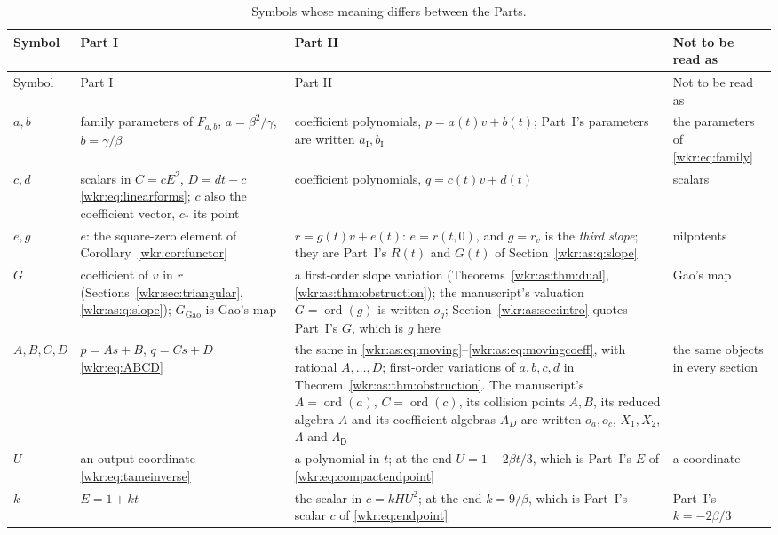 \documentclass[11pt,a4paper]{article}
\numberwithin{equation}{section}
\theoremstyle{definition}
\theoremstyle{remark}
\newcommand{\cstar}{c_*}
\newcommand{\ord}{\operatorname{ord}}
\newcommand{\Dcap}{\mathsf D}
\begin{document}
\begingroup\small
\setlength{\tabcolsep}{4pt}
\begin{longtable}{@{}>{\raggedright}p{}>{\raggedright}p{}>{\raggedright}p{}>{\raggedright\arraybackslash}p{}@{}}
\caption{Symbols whose meaning differs between the Parts.}
\label{wkr:as:tab:notation}\\
\toprule
Symbol & Part I & Part II & Not to be read as\\
\midrule
\endfirsthead
\toprule
Symbol & Part I & Part II & Not to be read as\\
\midrule
\endhead
$a,b$ & family parameters of $F_{a,b}$, $a=\beta^2/\gamma$, $b=\gamma/\beta$ &
coefficient polynomials, $p=a(t)v+b(t)$; Part~I's parameters are written
$a_{\mathrm I},b_{\mathrm I}$ & the parameters of \eqref{wkr:eq:family}\\
$c,d$ & scalars in $C=cE^2$, $D=dt-c$ \eqref{wkr:eq:linearforms}; $c$ also
the coefficient vector, $\cstar$ its point & coefficient polynomials,
$q=c(t)v+d(t)$ & scalars\\
$e,g$ & $e$: the square-zero element of Corollary~\ref{wkr:cor:functor} &
$r=g(t)v+e(t)$: $e=r(t,0)$, and $g=r_v$ is the \emph{third slope}; they
are Part~I's $R(t)$ and $G(t)$ of Section~\ref{wkr:as:q:slope} & nilpotents\\
$G$ & coefficient of $v$ in $r$ (Sections~\ref{wkr:sec:triangular},
\ref{wkr:as:q:slope}); $G_{\mathrm{Gao}}$ is Gao's map & a first-order
slope variation (Theorems~\ref{wkr:as:thm:dual},
\ref{wkr:as:thm:obstruction}); the manuscript's valuation
$G=\ord(g)$ is written $o_g$; Section~\ref{wkr:as:sec:intro}
quotes Part~I's $G$, which is $g$ here & Gao's map\\
$A,B,C,D$ & $p=As+B$, $q=Cs+D$ \eqref{wkr:eq:ABCD} & the same in
\eqref{wkr:as:eq:moving}--\eqref{wkr:as:eq:movingcoeff}, with rational
$A,\ldots,D$; first-order variations of $a,b,c,d$ in
Theorem~\ref{wkr:as:thm:obstruction}. The manuscript's $A=\ord(a)$,
$C=\ord(c)$, its collision points $A,B$, its reduced algebra $A$ and its
coefficient algebras $A_D$ are written $o_a,o_c$, $X_1,X_2$, $\Lambda$ and
$\Lambda_{\Dcap}$ & the same objects in every section\\
$U$ & an output coordinate \eqref{wkr:eq:tameinverse} & a polynomial in
$t$; at the end $U=1-2\beta t/3$, which is Part~I's $E$ of
\eqref{wkr:eq:compactendpoint} & a coordinate\\
$k$ & $E=1+kt$ & the scalar in $c=kHU^2$; at the end $k=9/\beta$, which is
Part~I's scalar $c$ of \eqref{wkr:eq:endpoint} & Part~I's $k=-2\beta/3$\\

\end{longtable}
\end{document}
